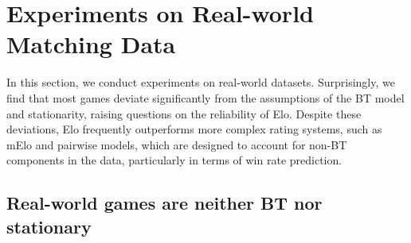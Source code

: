 


\section{Experiments on Real-world Matching Data}

In this section, we conduct experiments on real-world datasets. Surprisingly, we find that most games deviate significantly from the assumptions of the BT model and stationarity, raising questions on the reliability of Elo. Despite these deviations, Elo frequently outperforms more complex rating systems, such as mElo and pairwise models, which are designed to account for non-BT components in the data, particularly in terms of win rate prediction.

\subsection{Real-world games are neither BT nor stationary}
\label{sec:hypo}

